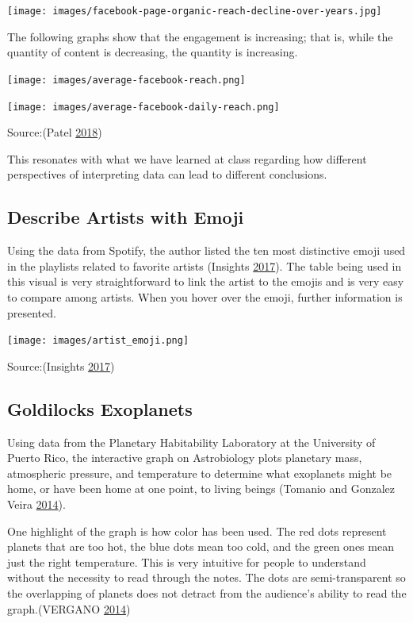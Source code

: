 \documentclass[]{book}
\begin{document}
\texttt{[image: images/facebook-page-organic-reach-decline-over-years.jpg]}

The following graphs show that the engagement is increasing; that is, while the quantity of content is decreasing, the quantity is increasing.

\texttt{[image: images/average-facebook-reach.png]}

\texttt{[image: images/average-facebook-daily-reach.png]}

Source:(Patel \protect\hyperlink{ref-facebook_organic}{2018})

This resonates with what we have learned at class regarding how different perspectives of interpreting data can lead to different conclusions.

\hypertarget{describe-artists-with-emoji}{%
\subsection{Describe Artists with Emoji}\label{describe-artists-with-emoji}}

Using the data from Spotify, the author listed the ten most distinctive emoji used in the playlists related to favorite artists (Insights \protect\hyperlink{ref-artist_emoji}{2017}). The table being used in this visual is very straightforward to link the artist to the emojis and is very easy to compare among artists. When you hover over the emoji, further information is presented.

\texttt{[image: images/artist\_emoji.png]}

Source:(Insights \protect\hyperlink{ref-artist_emoji}{2017})

\hypertarget{goldilocks-exoplanets}{%
\subsection{Goldilocks Exoplanets}\label{goldilocks-exoplanets}}

Using data from the Planetary Habitability Laboratory at the University of Puerto Rico, the interactive graph on Astrobiology plots planetary mass, atmospheric pressure, and temperature to determine what exoplanets might be home, or have been home at one point, to living beings (Tomanio and Gonzalez Veira \protect\hyperlink{ref-goldilocks_worlds}{2014}).

One highlight of the graph is how color has been used. The red dots represent planets that are too hot, the blue dots mean too cold, and the green ones mean just the right temperature. This is very intuitive for people to understand without the necessity to read through the notes. The dots are semi-transparent so the overlapping of planets does not detract from the audience's ability to read the graph.(VERGANO \protect\hyperlink{ref-Dan}{2014})
\end{document}
